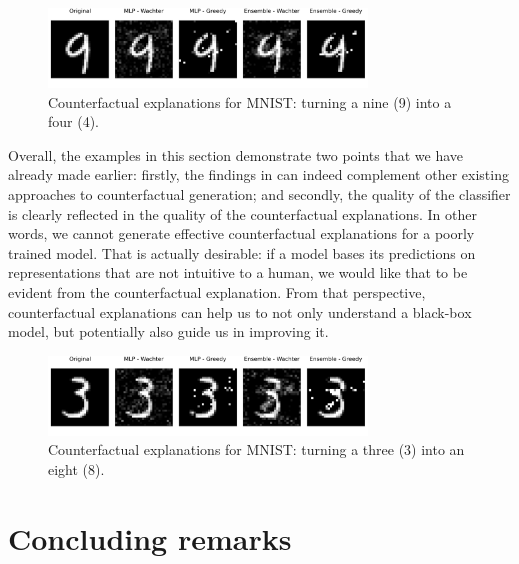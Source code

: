 \documentclass[
  letterpaper,
  DIV=11,
  numbers=noendperiod]{scrartcl}
\begin{document}
\begin{figure}

{\centering \includegraphics[width=3.33333in,height=0.83333in]{www/mnist_9_to_4.png}

}

\caption{\label{fig-mnist-9to4}Counterfactual explanations for MNIST:
turning a nine (9) into a four (4).}

\end{figure}

Overall, the examples in this section demonstrate two points that we
have already made earlier: firstly, the findings in
\cite{schut2021generating} can indeed complement other existing
approaches to counterfactual generation; and secondly, the quality of
the classifier is clearly reflected in the quality of the counterfactual
explanations. In other words, we cannot generate effective
counterfactual explanations for a poorly trained model. That is actually
desirable: if a model bases its predictions on representations that are
not intuitive to a human, we would like that to be evident from the
counterfactual explanation. From that perspective, counterfactual
explanations can help us to not only understand a black-box model, but
potentially also guide us in improving it.

\begin{figure}

{\centering \includegraphics[width=3.33333in,height=0.83333in]{www/mnist_3_to_8.png}

}

\caption{\label{fig-mnist-3to8}Counterfactual explanations for MNIST:
turning a three (3) into an eight (8).}

\end{figure}

\hypertarget{sec-conclude}{%
\section{Concluding remarks}\label{sec-conclude}}
\end{document}
